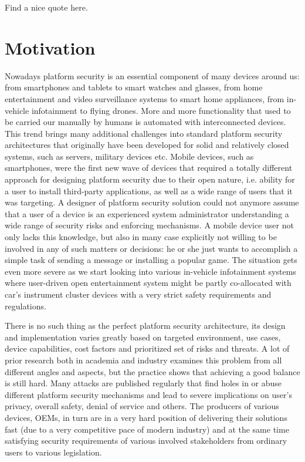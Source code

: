 \begin{quoting}
Find a nice quote here.
\end{quoting}

\section{Motivation}

Nowadays platform security is an essential component of many devices around us: from smartphones and tablets to smart watches and glasses, from home entertainment and video surveillance systems to smart home appliances, from in-vehicle infotainment to flying drones. More and more functionality that used to be carried our manually by humans is automated with interconnected devices. This trend brings many additional challenges into standard platform security architectures that originally have been developed for solid and relatively closed systems, such as servers, military devices etc. Mobile devices, such as smartphones, were the first new wave of devices that required a totally different approach for designing platform security due to their open nature, i.e. ability for a user to install third-party applications, as well as a wide range of users that it was targeting. A designer of platform security solution could not anymore assume that a user of a device is an experienced system administrator understanding a wide range of security risks and enforcing mechanisms. A mobile device user not only lacks this knowledge, but also in many case explicitly not willing to be involved in any of such matters or decisions: he or she just wants to accomplish a simple task of sending a message or installing a popular game. The situation gets even more severe as we start looking into various in-vehicle infotainment systems where user-driven open entertainment system might be partly co-allocated with car's instrument cluster devices with a very strict safety requirements and regulations. 

There is no such thing as the perfect platform security architecture, its design and implementation varies greatly based on targeted environment, use cases, device capabilities, cost factors and prioritized set of risks and threats. A lot of prior research both in academia and industry examines this problem from all different angles and aspects, but the practice shows that achieving a good balance is still hard. Many attacks are published regularly that find holes in or abuse different platform security mechanisms and lead to severe implications on user's privacy, overall safety, denial of service and others. The producers of various devices, OEMs, in turn are in a very hard position of delivering their solutions fast (due to a very competitive pace of modern industry) and at the same time satisfying security requirements of various involved stakeholders from ordinary users to various legislation. 

